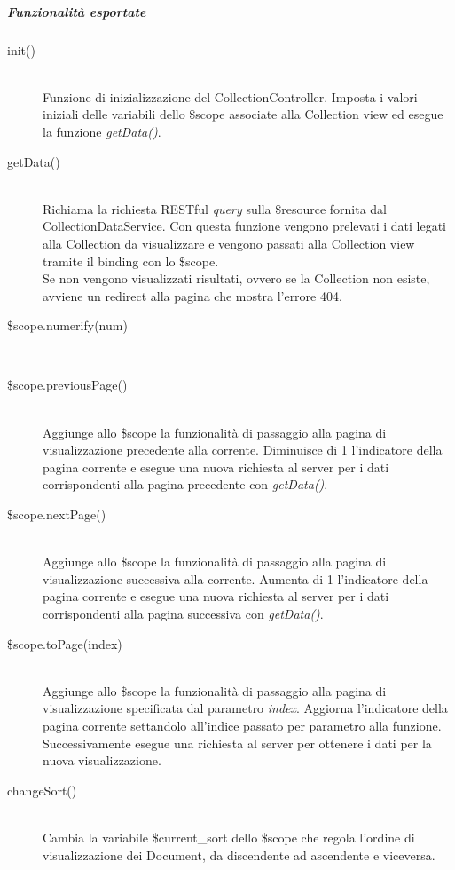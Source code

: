 \subparagraph{Funzionalità esportate}
\begin{description}
 \item[init()] \hfill \\
 Funzione di inizializzazione del CollectionController. Imposta i valori iniziali delle variabili dello
 \$scope associate alla Collection view ed esegue la funzione \emph{getData()}.
 
 \item[getData()] \hfill \\
 Richiama la richiesta RESTful \textit{query} sulla \$resource fornita dal CollectionDataService.
 Con questa funzione vengono prelevati i dati legati alla Collection da visualizzare e vengono
 passati alla Collection view tramite il binding con lo \$scope. \\
 Se non vengono visualizzati risultati, ovvero se la Collection non esiste, avviene un redirect alla pagina
 che mostra l'errore 404.
 
 \item[\$scope.numerify(num)] \hfill \\
 
 \item[\$scope.previousPage()] \hfill \\
 Aggiunge allo \$scope la funzionalità di passaggio alla pagina di visualizzazione precedente alla corrente.
 Diminuisce di 1 l'indicatore della pagina corrente e esegue una nuova richiesta al server per i dati corrispondenti
 alla pagina precedente con \emph{getData()}.
 
 \item[\$scope.nextPage()] \hfill \\
 Aggiunge allo \$scope la funzionalità di passaggio alla pagina di visualizzazione successiva alla corrente.
 Aumenta di 1 l'indicatore della pagina corrente e esegue una nuova richiesta al server per i dati corrispondenti
 alla pagina successiva con \emph{getData()}.
 
 \item[\$scope.toPage(index)] \hfill \\
 Aggiunge allo \$scope la funzionalità di passaggio alla pagina di visualizzazione specificata dal parametro \emph{index}.
 Aggiorna l'indicatore della pagina corrente settandolo all'indice passato per parametro alla funzione.
 Successivamente esegue una richiesta al server per ottenere i dati per la nuova visualizzazione.
 
 \item[changeSort()] \hfill \\
 Cambia la variabile \$current_sort dello \$scope che regola l'ordine di visualizzazione dei Document, da discendente ad
 ascendente e viceversa.
 

\end{description}
